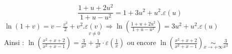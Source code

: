 {\begin{enumerate}
{        $$
        \frac{1+u+2 u^{2}}{1+u-u^{2}}=1+3 u^{2}+u^{2} . \varepsilon(u)
        $$
        $\ln (1+v)=v-\frac{v^{2}}{2}+v^{2} . \underset{v \neq 0}{\varepsilon(v)} \Rightarrow \ln \left(\frac{1+u+2 u^{2}}{1+u-u^{2}}\right)=3 u^{2}+u^{2} . \varepsilon(u)$\\
        Ainsi : $\ln \left(\frac{x^{2}+x+2}{x^{2}+x-1}\right)=\frac{3}{x^{2}}+\frac{1}{x^{2}} \cdot \varepsilon\left(\frac{1}{x}\right)$ ou encore $\ln \left(\frac{x^{2}+x+2}{x^{2}+x-1}\right) \underset{x \rightarrow+\infty}{\sim} \frac{3}{x^{2}}$}
    \end{enumerate}
}
